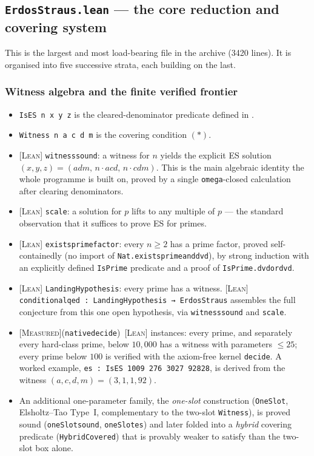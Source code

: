 \documentclass[11pt]{article}
\theoremstyle{plain}
\theoremstyle{definition}
\theoremstyle{remark}
\newcommand{\LEAN}{\textcolor{proved}{\textsc{[Lean]}}}
\newcommand{\MEASURED}{\textcolor{claimed}{\textsc{[Measured]}}}
\newcommand{\file}[1]{\texttt{#1}}
\newcommand{\lean}[1]{\texttt{#1}}
\renewcommand{\_}{\textunderscore\allowbreak}
\begin{document}
\subsection{\file{ErdosStraus.lean} — the core reduction and covering system}
\label{subsec:erdosstraus-lean}

This is the largest and most load-bearing file in the archive (3420 lines). It is organised
into five successive strata, each building on the last.

\subsubsection{Witness algebra and the finite verified frontier}

\begin{itemize}[leftmargin=1.4em]
  \item \lean{IsES n x y z} is the cleared-denominator predicate defined in .
  \item \lean{Witness n a c d m} is the covering condition $(\ast)$.
  \item \LEAN{} \lean{witness\_sound}: a witness for $n$ yields the explicit ES solution
        $(x,y,z)=(adm,\,n\!\cdot\! acd,\,n\!\cdot\! cdm)$. This is the main algebraic identity
        the whole programme is built on, proved by a single \texttt{omega}-closed calculation
        after clearing denominators.
  \item \LEAN{} \lean{scale}: a solution for $p$ lifts to any multiple of $p$ — the standard
        observation that it suffices to prove ES for primes.
  \item \LEAN{} \lean{exists\_prime\_factor}: every $n\ge 2$ has a prime factor, proved
        self-containedly (no import of \texttt{Nat.exists\_prime\_and\_dvd}), by strong
        induction with an explicitly defined \lean{IsPrime} predicate and a proof of
        \lean{IsPrime.dvd\_or\_dvd}.
  \item \LEAN{} \lean{LandingHypothesis}: every prime has a witness. \LEAN{}
        \lean{conditional\_qed : LandingHypothesis → ErdosStraus} assembles the full conjecture
        from this one open hypothesis, via \lean{witness\_sound} and \lean{scale}.
  \item \MEASURED (\texttt{native\_decide})~\LEAN{} instances: every prime, and separately every
        hard-class prime, below $10{,}000$ has a witness with parameters $\le 25$; every prime
        below $100$ is verified with the axiom-free kernel \texttt{decide}. A worked example,
        \lean{es\_1009 : IsES 1009\ 276\ 3027\ 92828}, is derived from the witness
        $(a,c,d,m)=(3,1,1,92)$.
  \item An additional one-parameter family, the \emph{one-slot} construction
        (\lean{OneSlot}, Elsholtz--Tao Type~I, complementary to the two-slot \lean{Witness}),
        is proved sound (\lean{oneSlot\_sound}, \lean{oneSlot\_es}) and later folded into a
        \emph{hybrid} covering predicate (\lean{HybridCovered}) that is provably weaker to
        satisfy than the two-slot box alone.
\end{itemize}
\end{document}
